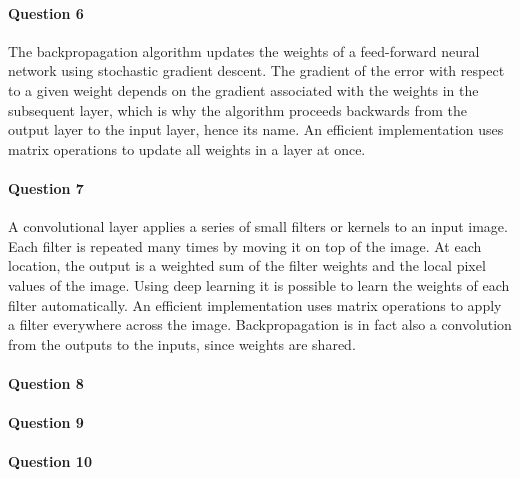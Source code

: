 \documentclass{article}
\begin{document}
\paragraph{Question 6}
The backpropagation algorithm updates the weights of a feed-forward neural network using stochastic gradient descent. The gradient of the error with respect to a given weight depends on the gradient associated with the weights in the subsequent layer, which is why the algorithm proceeds backwards from the output layer to the input layer, hence its name. An efficient implementation uses matrix operations to update all weights in a layer at once.

\paragraph{Question 7}
A convolutional layer applies a series of small filters or kernels to an input image. Each filter is repeated many times by moving it on top of the image. At each location, the output is a weighted sum of the filter weights and the local pixel values of the image. Using deep learning it is possible to learn the weights of each filter automatically. An efficient implementation uses matrix operations to apply a filter everywhere across the image. Backpropagation is in fact also a convolution from the outputs to the inputs, since weights are shared.

\paragraph{Question 8}


\paragraph{Question 9}


\paragraph{Question 10}
\end{document}
